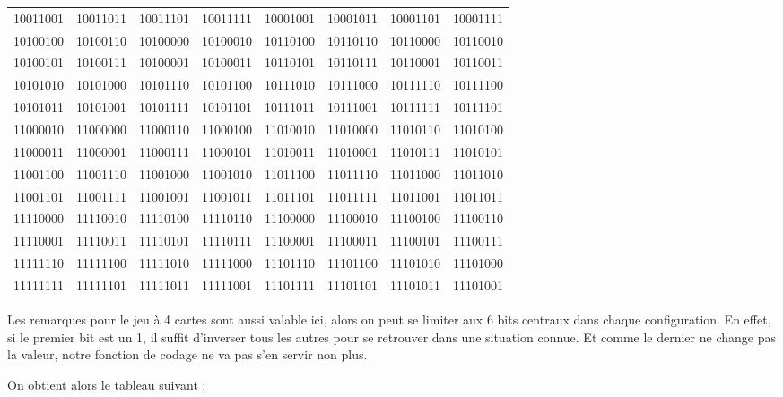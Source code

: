 \documentclass[10pt,a4paper,onecolumn]{article}
\begin{document}
\begin{tabular}{|c|c|c|c|c|c|c|c|}
10011001 & 10011011 & 10011101 & 10011111 & 10001001 & 10001011 & 10001101 & 10001111 \\
10100100 & 10100110 & 10100000 & 10100010 & 10110100 & 10110110 & 10110000 & 10110010 \\
10100101 & 10100111 & 10100001 & 10100011 & 10110101 & 10110111 & 10110001 & 10110011 \\
10101010 & 10101000 & 10101110 & 10101100 & 10111010 & 10111000 & 10111110 & 10111100 \\
10101011 & 10101001 & 10101111 & 10101101 & 10111011 & 10111001 & 10111111 & 10111101 \\
11000010 & 11000000 & 11000110 & 11000100 & 11010010 & 11010000 & 11010110 & 11010100 \\
11000011 & 11000001 & 11000111 & 11000101 & 11010011 & 11010001 & 11010111 & 11010101 \\
11001100 & 11001110 & 11001000 & 11001010 & 11011100 & 11011110 & 11011000 & 11011010 \\
11001101 & 11001111 & 11001001 & 11001011 & 11011101 & 11011111 & 11011001 & 11011011 \\
11110000 & 11110010 & 11110100 & 11110110 & 11100000 & 11100010 & 11100100 & 11100110 \\
11110001 & 11110011 & 11110101 & 11110111 & 11100001 & 11100011 & 11100101 & 11100111 \\
11111110 & 11111100 & 11111010 & 11111000 & 11101110 & 11101100 & 11101010 & 11101000 \\
11111111 & 11111101 & 11111011 & 11111001 & 11101111 & 11101101 & 11101011 & 11101001 \\
\hline
\end{tabular}

Les remarques pour le jeu à 4 cartes sont aussi valable ici, alors on peut se limiter aux 6 bits centraux dans chaque configuration. En effet, si le premier bit est un 1, il suffit d'inverser tous les autres pour se retrouver dans une situation connue. Et comme le dernier ne change pas la valeur, notre fonction de codage ne va pas s'en servir non plus.

On obtient alors le tableau suivant : 
\end{document}
